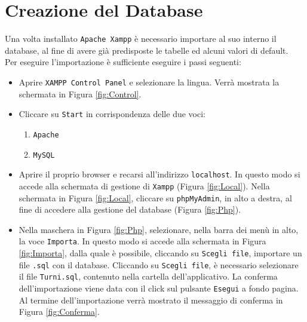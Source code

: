 \section{Creazione del Database}
Una volta installato \verb|Apache Xampp| è necessario importare al suo interno il database, al fine di avere già predisposte le tabelle ed alcuni valori di default.\\
Per eseguire l'importazione è sufficiente eseguire i passi seguenti:
\begin{itemize}
	\item Aprire \verb|XAMPP Control Panel| e selezionare la lingua. Verrà mostrata la schermata in Figura \ref{fig:Control}.
	\item Cliccare su \verb|Start| in corrispondenza delle due voci:
		\begin{enumerate}
			\item \verb|Apache|
			\item \verb|MySQL|
		\end{enumerate}
	\item Aprire il proprio browser e recarsi all'indirizzo \verb|localhost|. In questo modo si accede alla schermata di gestione di \verb|Xampp| (Figura \ref{fig:Local}).
		\noindent
		Nella schermata in Figura \ref{fig:Local}, cliccare su \verb|phpMyAdmin|, in alto a destra, al fine di accedere alla gestione del database (Figura \ref{fig:Php}).
	\item Nella maschera in Figura \ref{fig:Php}, selezionare, nella barra dei menù in alto, la voce \verb|Importa|. In questo modo si accede alla schermata in Figura \ref{fig:Importa}, dalla quale è possibile, cliccando su \verb|Scegli file|, importare un file \verb|.sql| con il database.
		Cliccando su \verb|Scegli file|, è necessario selezionare il file \verb|Turni.sql|, contenuto nella cartella dell'applicativo. La conferma dell'importazione viene data con il click sul pulsante \verb|Esegui| a fondo pagina.\\
		Al termine dell'importazione verrà mostrato il messaggio di conferma in Figura \ref{fig:Conferma}.
\end{itemize}
\newpage
